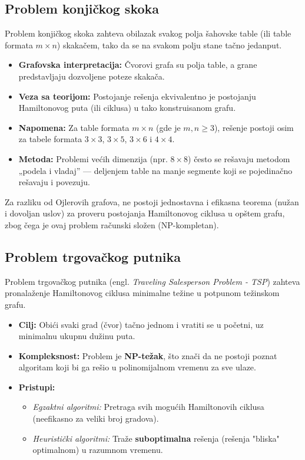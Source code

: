 \documentclass[a4paper,12pt,twoside]{report}
\numberwithin{algorithm}{section}
\begin{document}
\subsection*{Problem konjičkog skoka}
Problem konjičkog skoka zahteva obilazak svakog polja šahovske table (ili table formata $m \times n$) skakačem, tako da se na svakom polju stane tačno jedanput.

\begin{itemize}
    \item \textbf{Grafovska interpretacija:} Čvorovi grafa su polja table, a grane predstavljaju dozvoljene poteze skakača.
    \item \textbf{Veza sa teorijom:} Postojanje rešenja ekvivalentno je postojanju Hamiltonovog puta (ili ciklusa) u tako konstruisanom grafu.
    \item \textbf{Napomena:} Za table formata $m \times n$ (gde je $m, n \geq 3$), rešenje postoji osim za tabele formata $3 \times 3$, $3 \times 5$, $3 \times 6$ i $4 \times 4$.
    \item \textbf{Metoda:} Problemi većih dimenzija (npr. $8 \times 8$) često se rešavaju metodom „podela i vladaj” — deljenjem table na manje segmente koji se pojedinačno rešavaju i povezuju.
\end{itemize}



Za razliku od Ojlerovih grafova, ne postoji jednostavna i efikasna teorema (nužan i dovoljan uslov) za proveru postojanja Hamiltonovog ciklusa u opštem grafu, zbog čega je ovaj problem računski složen (NP-kompletan).

\subsection{Problem trgovačkog putnika}
Problem trgovačkog putnika (engl. \textit{Traveling Salesperson Problem - TSP}) zahteva pronalaženje Hamiltonovog ciklusa minimalne težine u potpunom težinskom grafu.

\begin{itemize}
    \item \textbf{Cilj:} Obići svaki grad (čvor) tačno jednom i vratiti se u početni, uz minimalnu ukupnu dužinu puta.
    \item \textbf{Kompleksnost:} Problem je \textbf{NP-težak}, što znači da ne postoji poznat algoritam koji bi ga rešio u polinomijalnom vremenu za sve ulaze.
    \item \textbf{Pristupi:}
    \begin{itemize}
        \item \textit{Egzaktni algoritmi:} Pretraga svih mogućih Hamiltonovih ciklusa (neefikasno za veliki broj gradova).
        \item \textit{Heuristički algoritmi:} Traže \textbf{suboptimalna} rešenja (rešenja "bliska" optimalnom) u razumnom vremenu.
    \end{itemize}
\end{itemize}
\end{document}
